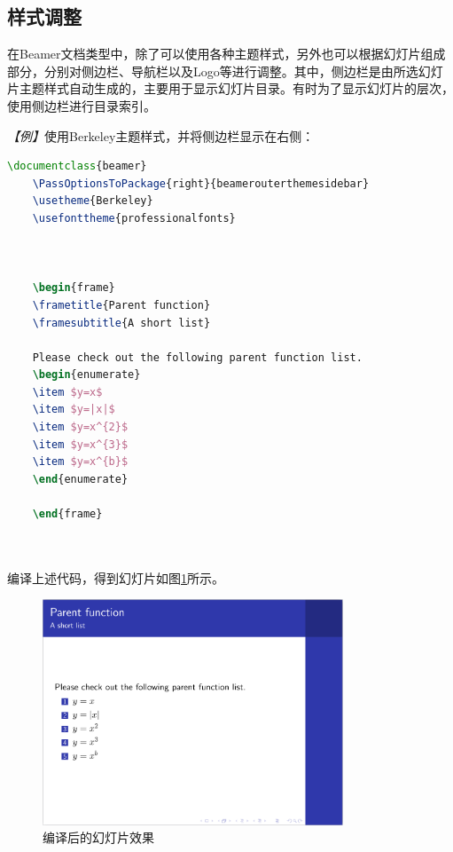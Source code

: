 \subsection{样式调整}

在Beamer文档类型中，除了可以使用各种主题样式，另外也可以根据幻灯片组成部分，分别对侧边栏、导航栏以及Logo等进行调整。其中，侧边栏是由所选幻灯片主题样式自动生成的，主要用于显示幻灯片目录。有时为了显示幻灯片的层次，使用侧边栏进行目录索引。

\emph{【例】}使用Berkeley主题样式，并将侧边栏显示在右侧：
\begin{lstlisting}[language=TeX]
    \documentclass{beamer}
    \PassOptionsToPackage{right}{beamerouterthemesidebar}
    \usetheme{Berkeley}
    \usefonttheme{professionalfonts}

    

    \begin{frame}
    \frametitle{Parent function}
    \framesubtitle{A short list}

    Please check out the following parent function list.
    \begin{enumerate}
    \item $y=x$
    \item $y=|x|$
    \item $y=x^{2}$
    \item $y=x^{3}$
    \item $y=x^{b}$
    \end{enumerate}

    \end{frame}

    
\end{lstlisting}

编译上述代码，得到幻灯片如图\ref{figeg:009}所示。

\begin{figure}[htbp]
    \centering
    \includegraphics[width = 0.8\textwidth]{images/ch_9/example_sec2_6.png}
    \caption{编译后的幻灯片效果}
    \label{figeg:009}
\end{figure}

